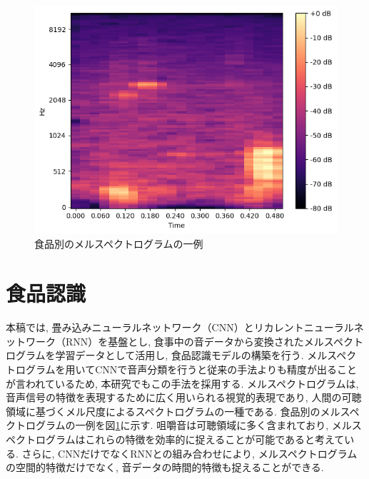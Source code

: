 \begin{figure}[t]
\begin{minipage}[b]{0.3\hsize}
        \includegraphics[width=\hsize]{img/melspec/yakisoba.png}
    \end{minipage}

    \caption{食品別のメルスペクトログラムの一例}
    \label{fig:sample-melspec-data}
\end{figure}

\section{食品認識}

本稿では, 畳み込みニューラルネットワーク（CNN）とリカレントニューラルネットワーク（RNN）を基盤とし, 食事中の音データから変換されたメルスペクトログラムを学習データとして活用し, 食品認識モデルの構築を行う. メルスペクトログラムを用いてCNNで音声分類を行うと従来の手法よりも精度が出ることが言われているため\cite{Dossou_2021_ICCV}, 本研究でもこの手法を採用する. メルスペクトログラムは, 音声信号の特徴を表現するために広く用いられる視覚的表現であり, 人間の可聴領域に基づくメル尺度によるスペクトログラムの一種である. 食品別のメルスペクトログラムの一例を図\ref{fig:sample-melspec-data}に示す. 咀嚼音は可聴領域に多く含まれており, メルスペクトログラムはこれらの特徴を効率的に捉えることが可能であると考えている. さらに, CNNだけでなくRNNとの組み合わせにより, メルスペクトログラムの空間的特徴だけでなく, 音データの時間的特徴も捉えることができる.

